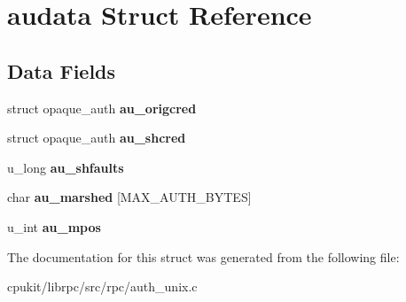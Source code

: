 \hypertarget{structaudata}{}\section{audata Struct Reference}
\label{structaudata}
\subsection*{Data Fields}
\begin{DoxyCompactItemize}
\item 
\mbox{\label{structaudata_aaa7eebca8bbea96d835544246f0fd25f}} 
struct opaque\+\_\+auth {\bfseries au\+\_\+origcred}
\item 
\mbox{\label{structaudata_a87d29e287f2be48af86b89d38a882e4d}} 
struct opaque\+\_\+auth {\bfseries au\+\_\+shcred}
\item 
\mbox{\label{structaudata_a923f8ee66f9d1ace4beb6bb5a7a8dfc4}} 
u\+\_\+long {\bfseries au\+\_\+shfaults}
\item 
\mbox{\label{structaudata_a138b5b03cd795ad8f9f755b0993deefd}} 
char {\bfseries au\+\_\+marshed} \mbox{[}M\+A\+X\+\_\+\+A\+U\+T\+H\+\_\+\+B\+Y\+T\+ES\mbox{]}
\item 
\mbox{\label{structaudata_a138aea55f1cdd4053683c189f7d9bc07}} 
u\+\_\+int {\bfseries au\+\_\+mpos}
\end{DoxyCompactItemize}


The documentation for this struct was generated from the following file\+:\begin{DoxyCompactItemize}
\item 
cpukit/librpc/src/rpc/auth\+\_\+unix.\+c\end{DoxyCompactItemize}
